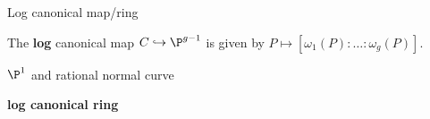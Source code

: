 \begin{frame}{Log canonical map/ring}


  \begin{definition}
    The \textbf{log} canonical map $C \hookrightarrow \P^{g-1}$ is given by $P
    \mapsto [\omega_1(P):\ldots:\omega_g(P)]$.
  \end{definition}

  \begin{example}
    $\P^1$ and rational normal curve
  \end{example}

  \begin{definition}
    \textbf{log canonical ring}
  \end{definition}




\end{frame}
